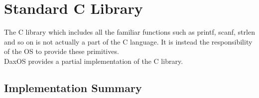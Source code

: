 \chapter{Standard C Library}\label{chapter:Standard C Library}

The C library which includes all the familiar functions such as printf, scanf, strlen and so on is not 
actually a part of the C language. It is instead the responsibility of the OS to provide these primitives.\\
DaxOS provides a partial implementation of the C library.

\section{Implementation Summary}\label{section:Implementation Summary}

